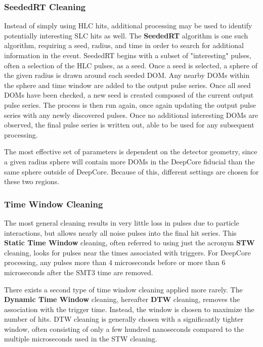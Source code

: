 \subsubsection{SeededRT Cleaning}
Instead of simply using HLC hits, additional processing may be used to identify potentially interesting SLC hits as well.
The \textbf{SeededRT} algorithm is one such algorithm, requiring a seed, radius, and time in order to search for additional information in the event.
SeededRT begins with a subset of "interesting" pulses, often a selection of the HLC pulses, as a seed.
Once a seed is selected, a sphere of the given radius is drawn around each seeded DOM. 
Any nearby DOMs within the sphere and time window are added to the output pulse series.
Once all seed DOMs have been checked, a new seed is created composed of the current output pulse series.
The process is then run again, once again updating the output pulse series with any newly discovered pulses.
Once no additional interesting DOMs are observed, the final pulse series is written out, able to be used for any subsequent processing.

The most effective set of parameters is dependent on the detector geometry, since a given radius sphere will contain more DOMs in the DeepCore fiducial than the same sphere outside of DeepCore.
Because of this, different settings are chosen for these two regions.

\subsubsection{Time Window Cleaning}
The most general cleaning results in very little loss in pulses due to particle interactions, but allows nearly all noise pulses into the final hit series.
This \textbf{Static Time Window} cleaning, often referred to using just the acronym \textbf{STW} cleaning, looks for pulses near the times associated with triggers.
For DeepCore processing, any pulses more than 4 microseconds before or more than 6 microseconds after the SMT3 time are removed.

There exists a second type of time window cleaning applied more rarely.
The \textbf{Dynamic Time Window} cleaning, hereafter \textbf{DTW} cleaning, removes the association with the trigger time. 
Instead, the window is chosen to maximize the number of hits.
DTW cleaning is generally chosen with a significantly tighter window, often consisting of only a few hundred nanoseconds compared to the multiple microseconds used in the STW cleaning.


